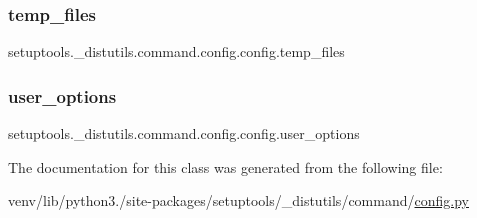 \subsubsection{\texorpdfstring{temp\+\_\+files}{temp\_files}}
{\footnotesize\ttfamily setuptools.\+\_\+distutils.\+command.\+config.\+config.\+temp\+\_\+files}

\mbox{\label{classsetuptools_1_1__distutils_1_1command_1_1config_1_1config_acd5e5e9f22c868b6b2e0d0595b6e6979}} 
\subsubsection{\texorpdfstring{user\+\_\+options}{user\_options}}
{\footnotesize\ttfamily setuptools.\+\_\+distutils.\+command.\+config.\+config.\+user\+\_\+options\hspace{0.3cm}{\ttfamily [static]}}



The documentation for this class was generated from the following file\+:\begin{DoxyCompactItemize}
\item 
venv/lib/python3./site-\/packages/setuptools/\+\_\+distutils/command/\hyperlink{setuptools_2__distutils_2command_2config_8py}{config.\+py}\end{DoxyCompactItemize}
